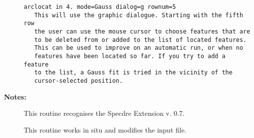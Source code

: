 \begin{description}
\begin{verbatim}
arclocat in 4. mode=Gauss dialog=g rownum=5
   This will use the graphic dialogue. Starting with the fifth row
   the user can use the mouse cursor to choose features that are
   to be deleted from or added to the list of located features.
   This can be used to improve on an automatic run, or when no
   features have been located so far. If you try to add a feature
   to the list, a Gauss fit is tried in the vicinity of the
   cursor-selected position.

\end{verbatim}

\item [{\bf Notes:}]
This routine recognises the Specdre Extension v. 0.7.

This routine works in situ and modifies the input file.

\end{description}
